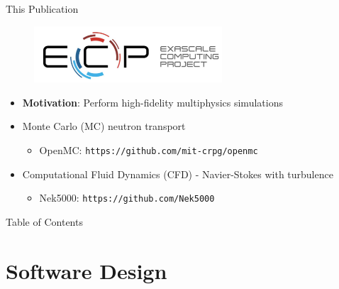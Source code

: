 \documentclass[10pt]{beamer}
\begin{document}
\begin{frame}{This Publication}

\begin{figure}
\includegraphics[width=7cm]{../Figures/exascalelogo.jpg}
\end{figure}

\begin{itemize}
\item \textbf{Motivation}: Perform high-fidelity multiphysics simulations\newline
\item Monte Carlo (MC) neutron transport
	\begin{itemize}
	\item OpenMC: {\tt https://github.com/mit-crpg/openmc}\newline
	\end{itemize}
\item Computational Fluid Dynamics (CFD) - Navier-Stokes with turbulence
	\begin{itemize}
	\item Nek5000: {\tt https://github.com/Nek5000}
	\end{itemize}
\end{itemize}
\end{frame}

\begin{frame}{Table of Contents}
\tableofcontents
\end{frame}

\section{Software Design}
\end{document}
